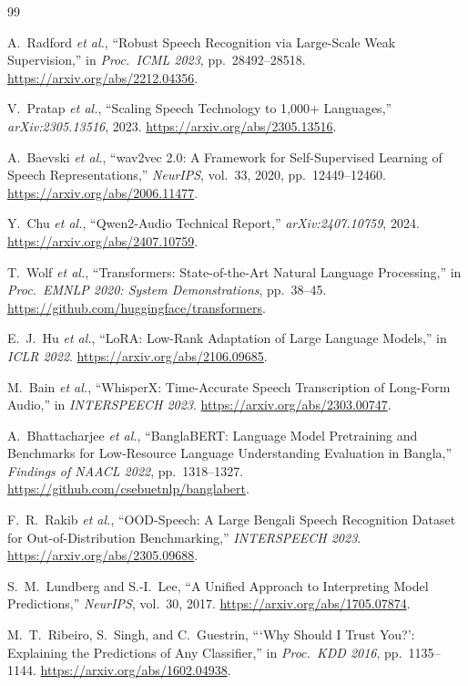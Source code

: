 \documentclass[12pt,a4paper]{article}
\begin{document}
\begin{thebibliography}{99}

A.~Radford \emph{et al.},
``Robust Speech Recognition via Large-Scale Weak Supervision,''
in \emph{Proc.\ ICML 2023}, pp.~28492--28518.
\url{https://arxiv.org/abs/2212.04356}.

V.~Pratap \emph{et al.},
``Scaling Speech Technology to 1{,}000+ Languages,''
\emph{arXiv:2305.13516}, 2023.
\url{https://arxiv.org/abs/2305.13516}.

A.~Baevski \emph{et al.},
``wav2vec 2.0: A Framework for Self-Supervised Learning of Speech
Representations,''
\emph{NeurIPS}, vol.~33, 2020, pp.~12449--12460.
\url{https://arxiv.org/abs/2006.11477}.

Y.~Chu \emph{et al.},
``Qwen2-Audio Technical Report,''
\emph{arXiv:2407.10759}, 2024.
\url{https://arxiv.org/abs/2407.10759}.

T.~Wolf \emph{et al.},
``Transformers: State-of-the-Art Natural Language Processing,''
in \emph{Proc.\ EMNLP 2020: System Demonstrations}, pp.~38--45.
\url{https://github.com/huggingface/transformers}.

E.~J.~Hu \emph{et al.},
``LoRA: Low-Rank Adaptation of Large Language Models,''
in \emph{ICLR 2022}.
\url{https://arxiv.org/abs/2106.09685}.

M.~Bain \emph{et al.},
``WhisperX: Time-Accurate Speech Transcription of Long-Form Audio,''
in \emph{INTERSPEECH 2023}.
\url{https://arxiv.org/abs/2303.00747}.

A.~Bhattacharjee \emph{et al.},
``BanglaBERT: Language Model Pretraining and Benchmarks for
Low-Resource Language Understanding Evaluation in Bangla,''
\emph{Findings of NAACL 2022}, pp.~1318--1327.
\url{https://github.com/csebuetnlp/banglabert}.

F.~R.~Rakib \emph{et al.},
``OOD-Speech: A Large Bengali Speech Recognition Dataset for
Out-of-Distribution Benchmarking,''
\emph{INTERSPEECH 2023}.
\url{https://arxiv.org/abs/2305.09688}.

S.~M.~Lundberg and S.-I.~Lee,
``A Unified Approach to Interpreting Model Predictions,''
\emph{NeurIPS}, vol.~30, 2017.
\url{https://arxiv.org/abs/1705.07874}.

M.~T.~Ribeiro, S.~Singh, and C.~Guestrin,
```Why Should I Trust You?': Explaining the Predictions of Any
Classifier,''
in \emph{Proc.\ KDD 2016}, pp.~1135--1144.
\url{https://arxiv.org/abs/1602.04938}.

\end{thebibliography}
\end{document}
